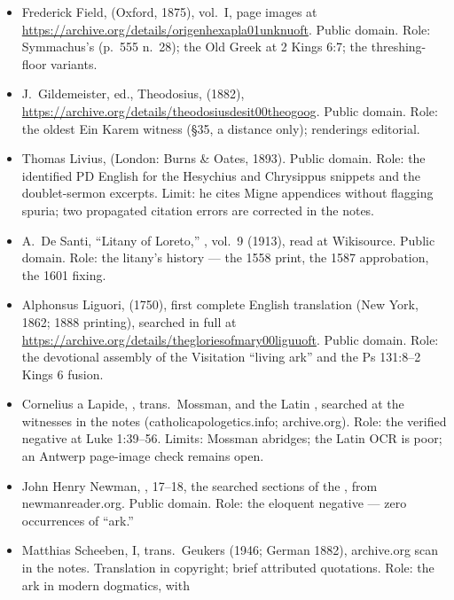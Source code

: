 \begin{itemize}
\item Frederick Field, 
(Oxford, 1875), vol.~I, page images at
\url{https://archive.org/details/origenhexapla01unknuoft}. Public
domain. Role: Symmachus's  (p.~555 n.~28); the Old
Greek  at 2 Kings 6:7; the threshing-floor variants.
\item J.~Gildemeister, ed., Theodosius, 
(1882), \url{https://archive.org/details/theodosiusdesit00theogoog}.
Public domain. Role: the oldest Ein Karem witness (\S 35, a distance
only); renderings editorial.
\item Thomas Livius,  (London: Burns \& Oates, 1893). Public domain.
Role: the identified PD English for the Hesychius and Chrysippus
snippets and the doublet-sermon excerpts. Limit: he cites Migne
appendices without flagging spuria; two propagated citation errors are
corrected in the notes.
\item A.~De Santi, ``Litany of Loreto,'' , vol.~9 (1913), read at Wikisource. Public domain. Role:
the litany's history --- the 1558 print, the 1587 approbation, the
1601 fixing.
\item Alphonsus Liguori,  (1750), first
complete English translation (New York, 1862; 1888 printing), searched
in full at \url{https://archive.org/details/thegloriesofmary00liguuoft}.
Public domain. Role: the devotional assembly of the Visitation
``living ark'' and the Ps 131:8--2 Kings 6 fusion.
\item Cornelius a Lapide, , trans.\
Mossman, and the Latin , searched at the witnesses
in the notes (catholicapologetics.info; archive.org). Role: the
verified negative at Luke 1:39--56. Limits: Mossman abridges; the
Latin OCR is poor; an Antwerp page-image check remains open.
\item John Henry Newman, ,
 17--18, the searched sections
of the \work{Letter to Pusey}, from newmanreader.org. Public domain.
Role: the eloquent negative --- zero occurrences of ``ark.''
\item Matthias Scheeben,  I, trans.\ Geukers (1946;
German 1882), archive.org scan in the notes. Translation in copyright;
brief attributed quotations. Role: the ark in modern dogmatics, with

\end{itemize}
